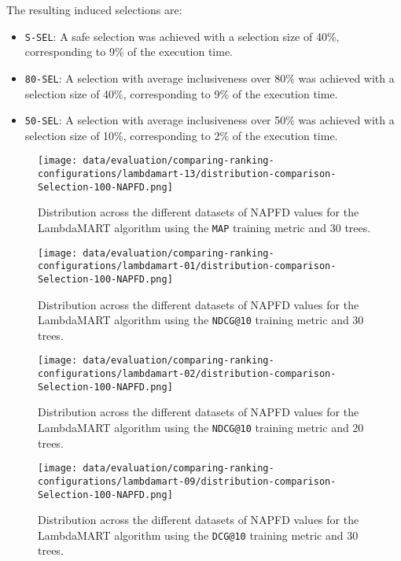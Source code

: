 The resulting induced selections are:
\begin{itemize}
    \item \texttt{S-SEL}: A safe selection was achieved with a selection size of 40\%, corresponding to 9\% of the execution time.
    \item \texttt{80-SEL}: A selection with average inclusiveness over 80\% was achieved with a selection size of 40\%, corresponding to 9\% of the execution time.
    \item \texttt{50-SEL}: A selection with average inclusiveness over 50\% was achieved with a selection size of 10\%, corresponding to 2\% of the execution time.
\end{itemize}

\begin{figure}
    \centering
    \begin{minipage}{.45\textwidth}
        \centering
        \texttt{[image: data/evaluation/comparing-ranking-configurations/lambdamart-13/distribution-comparison-Selection-100-NAPFD.png]}
        \parbox{0.9\textwidth}{
            \caption{Distribution across the different datasets of NAPFD values for the LambdaMART algorithm using the \texttt{MAP} training metric and 30 trees.}
        \label{fig:lambdamart-13-napfd}
            }
    \end{minipage}%
    \begin{minipage}{.45\textwidth}
        \centering
        \texttt{[image: data/evaluation/comparing-ranking-configurations/lambdamart-01/distribution-comparison-Selection-100-NAPFD.png]}
        \parbox{0.9\textwidth}{
            \caption{Distribution across the different datasets of NAPFD values for the LambdaMART algorithm using the \texttt{NDCG@10} training metric and 30 trees.}
        \label{fig:lambdamart-01-napfd}
            }

    \end{minipage}%
\end{figure}

\begin{figure}
    \centering
    \begin{minipage}{.45\textwidth}
        \centering
        \texttt{[image: data/evaluation/comparing-ranking-configurations/lambdamart-02/distribution-comparison-Selection-100-NAPFD.png]}
        \parbox{0.9\textwidth}{
            \caption{Distribution across the different datasets of NAPFD values for the LambdaMART algorithm using the \texttt{NDCG@10} training metric and 20 trees.}
        \label{fig:lambdamart-02-napfd}
            }
    \end{minipage}%
    \begin{minipage}{.45\textwidth}
        \centering
        \texttt{[image: data/evaluation/comparing-ranking-configurations/lambdamart-09/distribution-comparison-Selection-100-NAPFD.png]}
        \parbox{0.9\textwidth}{
            \caption{Distribution across the different datasets of NAPFD values for the LambdaMART algorithm using the \texttt{DCG@10} training metric and 30 trees.}
        \label{fig:lambdamart-09-napfd}
            }
    \end{minipage}%
\end{figure}

